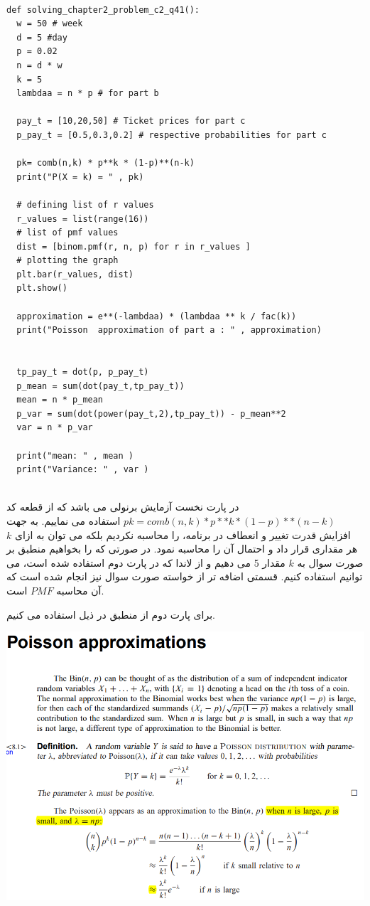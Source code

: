 \documentclass[a4paper,14pt]{article}
\begin{document}
		\fontsize{11}{11}\selectfont
\begin{latin}
	\begin{lstlisting}

def solving_chapter2_problem_c2_q41():
  w = 50 # week
  d = 5 #day
  p = 0.02
  n = d * w
  k = 5
  lambdaa = n * p # for part b

  pay_t = [10,20,50] # Ticket prices for part c
  p_pay_t = [0.5,0.3,0.2] # respective probabilities for part c

  pk= comb(n,k) * p**k * (1-p)**(n-k)
  print("P(X = k) = " , pk)

  # defining list of r values
  r_values = list(range(16))
  # list of pmf values
  dist = [binom.pmf(r, n, p) for r in r_values ]
  # plotting the graph
  plt.bar(r_values, dist)
  plt.show()

  approximation = e**(-lambdaa) * (lambdaa ** k / fac(k))
  print("Poisson  approximation of part a : " , approximation)


  tp_pay_t = dot(p, p_pay_t)
  p_mean = sum(dot(pay_t,tp_pay_t))
  mean = n * p_mean
  p_var = sum(dot(power(pay_t,2),tp_pay_t)) - p_mean**2
  var = n * p_var

  print("mean: " , mean )
  print("Variance: " , var )


	\end{lstlisting}
\end{latin}
		\fontsize{14}{14}\selectfont
	

در پارت نخست آزمایش برنولی می باشد که از قطعه کد $pk= comb(n,k) * p**k * (1-p)**(n-k)$ استفاده می نماییم.
به جهت افزایش قدرت تغییر و انعطاف در برنامه،  را محاسبه نکردیم بلکه می توان به ازای $k$ هر مقداری قرار داد و احتمال آن را محاسبه نمود.
در صورتی که  را بخواهیم منطبق بر صورت سوال به $k$ مقدار 5 می دهیم و از لاندا که در پارت دوم استفاده شده است، می توانیم استفاده کنیم.
قسمتی اضافه تر از خواسته صورت سوال نیز انجام شده است که آن محاسبه $PMF$ است.

برای پارت دوم از  منطبق در ذیل استفاده می کنیم.

{
	\centering
	\includegraphics[width=0.7\textheight]{approximations.png}
	
}
\end{document}

